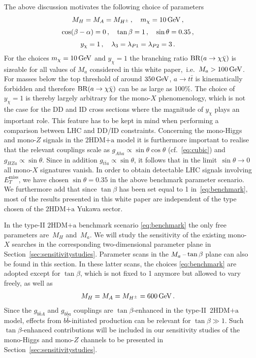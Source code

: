 \documentclass[a4paper, 11pt,notoc]{article}
\newcommand{\MET}{\ensuremath{E_T^\mathrm{miss}}\xspace}
\newcommand{\hdma}{\ensuremath{\textrm{2HDM+a}}\xspace}
\begin{document}
The above discussion motivates the following choice of parameters
\begin{gather} 
 M_H  = M_A = M_{H^\pm} \,, \quad m_\chi = 10 \, {\rm GeV} \,,\notag  \\[1mm]
\cos (\beta - \alpha) = 0\,, \quad   \tan \beta = 1\,, \quad  \sin\theta = 0.35\,, \label{eq:benchmark} \\[1mm]
y_\chi  = 1\,, \quad \lambda_3 =  \lambda_{P1} = \lambda_{P2} =3 \,. \notag 
\end{gather}
For the choices $m_\chi = 10 \, {\rm GeV}$ and $y_\chi  = 1$ the  branching ratio ${\rm BR} (a \to \chi \bar \chi)$ is sizeable for all values of $M_a$ considered in this white paper,~i.e.~$M_a > 100 \, {\rm GeV}$. For masses below the top threshold of around $350 \, {\rm GeV}$, $a \to t \bar t$ is  kinematically forbidden and therefore ${\rm BR} (a \to \chi \bar \chi)$ can be as large as 100\%.  The choice of~$y_\chi  = 1$ is thereby largely arbitrary for the mono-$X$ phenomenology, which is not the case for the DD and ID cross sections where the magnitude of $y_\chi$ plays an important role. This feature  has to be  kept in mind when performing a comparison between LHC and DD/ID constraints. Concerning the mono-Higgs and mono-$Z$ signals in the \hdma model it is furthermore important to realise that the relevant couplings scale as $g_{Aha} \propto \sin \theta \cos \theta$  (cf.~\eqref{eq:cubic}) and $g_{HZa} \propto \sin \theta$. Since in addition $g_{t \bar t a} \propto \sin \theta$,  it follows that in the limit~$\sin \theta \to 0$ all mono-$X$ signatures vanish. In order to obtain detectable LHC signals involving $\MET$, we have chosen $\sin\theta = 0.35$ in the above benchmark parameter scenario. We furthermore add that since $\tan \beta$ has been set equal to 1 in~\eqref{eq:benchmark}, most of the results presented in this white paper are independent of the type chosen of the \hdma Yukawa sector. 

In the  type-II \hdma  benchmark scenario \eqref{eq:benchmark} the only free parameters are~$M_H$ and~$M_a$. We will study the sensitivity of the existing mono-$X$ searches in the corresponding two-dimensional parameter plane in Section~\ref{sec:sensitivitystudies}. Parameter scans in the $M_a\hspace{0.5mm}$--$\hspace{0.5mm}\tan \beta$ plane can also be found in this section.  In these latter scans, the choices \eqref{eq:benchmark} are adopted except for $\tan \beta$, which is not fixed to 1 anymore but allowed to vary freely, as well as    
\begin{equation} \label{eq:matbscan}
M_H  = M_A = M_{H^\pm} =  600 \, {\rm GeV} \,.
\end{equation} 
Since the $g_{b \bar b A}$ and $g_{b \bar b a}$ couplings are $\tan \beta$-enhanced in the type-II~\hdma model,  effects from $b \bar b$-initiated production can be relevant  for $\tan \beta \gg 1$. Such $\tan \beta$-enhanced contributions will be included in our sensitivity studies of the mono-Higgs and mono-$Z$ channels to be presented in Section~\ref{sec:sensitivitystudies}. 
\end{document}
